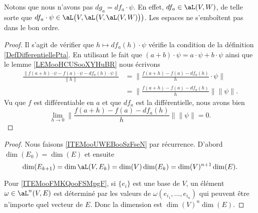 Notons que nous n'avons pas \( dg_a=df_a\cdot \psi\). En effet, \( df_a\in \aL( V,W )\), de telle sorte que \( df_a\cdot\psi\in \aL\big( V,\aL\big( V,\aL(V,W) \big) \big)\). Les espaces ne s'emboîtent pas dans le bon ordre.

\begin{proof}
    Il s'agit de vérifier que \( h\mapsto df_a(h)\cdot \psi\) vérifie la condition de la définition \ref{DefDifferentiellePta}. En utilisant le fait que \( (a+b)\cdot \psi = a\cdot \psi+b\cdot \psi\) ainsi que le lemme \ref{LEMooHCUSooXYHuBR} nous écrivons
    \begin{subequations}
        \begin{align}
            \frac{ \| f(a+h)\cdot \psi-f(a)\cdot\psi-df_a(h)\cdot \psi\|  }{ \| h \| }&=\| \frac{ f(a+h)-f(a)-df_a(h) }{ h  }\cdot \psi\| \\
            &=\| \frac{ f(a+h)-f(a)-df_a(h) }{ h } \|\| \psi \|.
        \end{align}
    \end{subequations}
    Vu que \( f\) est différentiable en \( a\) et que \( df_a\) est la différentielle, nous avons bien
    \begin{equation}
        \lim_{h\to 0}  \| \frac{ f(a+h)-f(a)-df_a(h) }{ h } \|\| \psi \|=0.
    \end{equation}
\end{proof}


\begin{proof}
    Nous faisons \ref{ITEMooUWEBooSzFseN} par récurrence. D'abord \( \dim(E_0)=\dim(E)\) et ensuite
    \begin{equation}
        \dim(E_{k+1})=\dim\aL(V,E_k)=\dim(V)\dim(E_k)=\dim(V)^{n+1}\dim(E).
    \end{equation}
    
    Pour \ref{ITEMooFMKQooFSMpgF}, si \( \{ e_i \}\) est une base de \( V\), un élément \( \omega\in \aL^n(V,E)\) est déterminé par les valeurs de \( \omega(e_{i_1},\ldots, e_{i_n})\) qui peuvent être n'importe quel vecteur de \( E\). Donc la dimension est \( \dim(V)^n\dim(E)\).
\end{proof}

